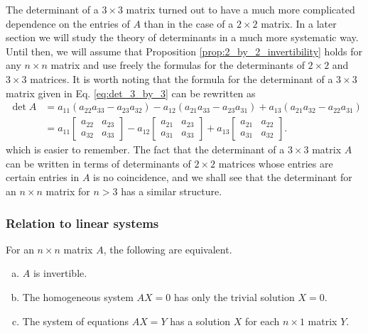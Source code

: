 \documentclass[12pt,letterpaper,reqno]{article}
\numberwithin{equation}{section}
\begin{document}
The determinant of a $3 \times 3$ matrix turned out to have a much more complicated dependence on the entries of $A$ than in the case of a $2 \times 2$ matrix. In a later section we will study the theory of determinants in a much more systematic way. Until then, we will assume that Proposition \ref{prop:2_by_2_invertibility} holds for any $n \times n$ matrix and use freely the formulas for the determinants of $2 \times 2$ and $3 \times 3$ matrices. It is worth noting that the formula for the determinant of a $3 \times 3$ matrix given in Eq. \eqref{eq:det_3_by_3} can be rewritten as 
\begin{align*}
	\det A &=a_{11}(a_{22}a_{33}-a_{23}a_{32})-a_{12}(a_{21}a_{33}-a_{23}a_{31})+a_{13}(a_{21}a_{32}-a_{22}a_{31}) \\
	&=a_{11}\begin{bmatrix}
		a_{22} & a_{23} \\ a_{32} & a_{33}
	\end{bmatrix}-a_{12}\begin{bmatrix}
		a_{21} & a_{23} \\
		a_{31} & a_{33}
	\end{bmatrix}+a_{13}\begin{bmatrix}
		a_{21} & a_{22} \\ 
		a_{31} & a_{32}
	\end{bmatrix}.
\end{align*}
which is easier to remember. The fact that the determinant of a $3 \times 3$ matrix $A$ can be written in terms of determinants of $2 \times 2$ matrices whose entries are certain entries in $A$ is no coincidence, and we shall see that the determinant for an $n \times n$ matrix for $n>3$ has a similar structure.

\subsubsection{Relation to linear systems}

\begin{thm} \label{thm:solution_sets_n_equations_n_unknowns}
		For an $n \times n$ matrix $A$, the following are equivalent.
	\begin{enumerate}[(a)]
		\item $A$ is invertible.
		\item The homogeneous system $AX=0$ has only the trivial solution $X=0$.
		\item The system of equations $AX=Y$ has a solution $X$ for each $n \times 1$ matrix $Y$.
	\end{enumerate}
\end{thm}
\end{document}
